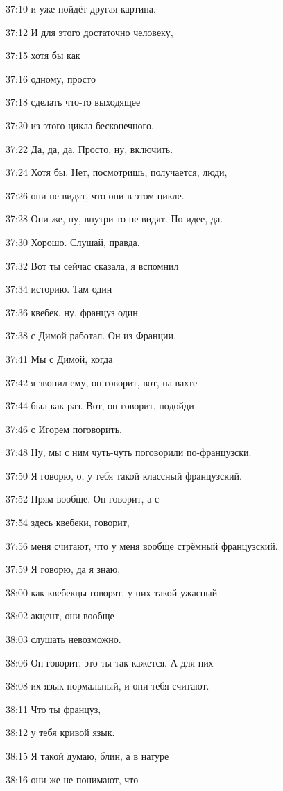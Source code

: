 37:10
и уже пойдёт другая картина.

37:12
И для этого достаточно человеку,

37:15
хотя бы как

37:16
одному, просто

37:18
сделать что-то выходящее

37:20
из этого цикла бесконечного.

37:22
Да, да, да. Просто, ну, включить.

37:24
Хотя бы. Нет, посмотришь, получается, люди,

37:26
они не видят, что они в этом цикле.

37:28
Они же, ну, внутри-то не видят. По идее, да.

37:30
Хорошо. Слушай, правда.

37:32
Вот ты сейчас сказала, я вспомнил

37:34
историю. Там один

37:36
квебек, ну, француз один

37:38
с Димой работал. Он из Франции.

37:41
Мы с Димой, когда

37:42
я звонил ему, он говорит, вот, на вахте

37:44
был как раз. Вот, он говорит, подойди

37:46
с Игорем поговорить.

37:48
Ну, мы с ним чуть-чуть поговорили по-французски.

37:50
Я говорю, о, у тебя такой классный французский.

37:52
Прям вообще. Он говорит, а с

37:54
здесь квебеки, говорит,

37:56
меня считают, что у меня вообще стрёмный французский.

37:59
Я говорю, да я знаю,

38:00
как квебекцы говорят, у них такой ужасный

38:02
акцент, они вообще

38:03
слушать невозможно.

38:06
Он говорит, это ты так кажется. А для них

38:08
их язык нормальный, и они тебя считают.

38:11
Что ты француз,

38:12
у тебя кривой язык.

38:15
Я такой думаю, блин, а в натуре

38:16
они же не понимают, что

